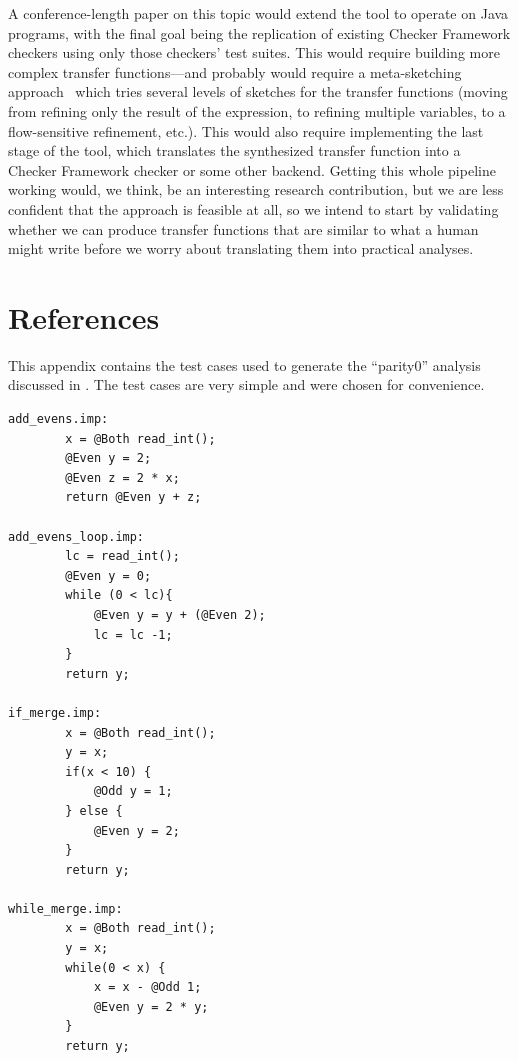 \documentclass[10pt,conference]{IEEEtran}
\begin{document}
A conference-length paper on this topic would extend the tool to operate
on Java programs, with the final goal being the replication of
existing Checker Framework checkers using only those checkers'
test suites. This would require building more
complex transfer functions---and probably would require
a meta-sketching approach~\cite{metasketching} which tries several levels of
sketches for the transfer functions (moving from refining only the result of the expression, to
refining multiple variables, to a flow-sensitive refinement, etc.).
This would also require implementing the last stage of the tool, which
translates the synthesized transfer function into a Checker Framework
checker or some other backend. Getting this whole pipeline working would,
we think, be an interesting research contribution, but we are less
confident that the approach is feasible at all, so we intend to start
by validating whether we can produce transfer functions that are
similar to what a human might write before we worry about translating
them into practical analyses.

\section{References}

\begingroup
\renewcommand{\section}[2]{}%



%
%
\endgroup

\appendix

This appendix contains the test cases used to generate the ``parity0''
analysis discussed in . The test cases are very simple and
were chosen for convenience.

\begin{lstlisting}
add_evens.imp:
        x = @Both read_int();
        @Even y = 2;
        @Even z = 2 * x;
        return @Even y + z;

add_evens_loop.imp:
        lc = read_int();
        @Even y = 0;
        while (0 < lc){
            @Even y = y + (@Even 2);
            lc = lc -1;
        }
        return y;

if_merge.imp:
        x = @Both read_int();
        y = x;
        if(x < 10) {
            @Odd y = 1;
        } else {
            @Even y = 2;
        }
        return y;

while_merge.imp:
        x = @Both read_int();
        y = x;
        while(0 < x) {
            x = x - @Odd 1;
            @Even y = 2 * y;
        }
        return y;

\end{lstlisting}
\end{document}
